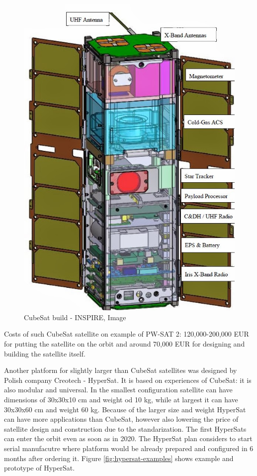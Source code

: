 \documentclass[12pt,a4paper,oneside]{article}
\begin{document}
\begin{figure}[!htbp]
\includegraphics[scale=0.45]{INSPIRE_JPL.jpg}
\centering
\caption{CubeSat build - INSPIRE, Image \cite{cubesat-build}}
\label{fig:cubesat-build}
\end{figure}

Costs of such CubeSat satellite on example of PW-SAT 2: 120,000-200,000 EUR for putting the satellite on the orbit and around 70,000 EUR for designing and building the satellite itself\cite{pw-pw-sat2}.

Another platform for slightly larger than CubeSat satellites was designed by Polish company Creotech - HyperSat\cite{hypersat}. It is based on experiences of CubeSat: it is also modular and universal. In the smallest configuration satellite can have dimensions of 30x30x10 cm and weight od 10 kg, while at largest it can have 30x30x60 cm and weight 60 kg. Because of the larger size and weight HyperSat can have more applications than CubeSat, however also lowering the price of satellite design and construction due to the standarization. The first HyperSats can enter the orbit even as soon as in 2020\cite{hypersat-space24}. The HyperSat plan considers to start serial manufacutre where platform would be already prepared and configured in 6 months after ordering it\cite{platforma-satelitarna-space24}. Figure \ref{fig:hypersat-examples} shows example and prototype of HyperSat.
\end{document}
